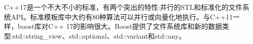 

C++17是一个不大不小的标准，有两个突出的特性:并行的STL和标准化的文件系统API。标准模板库中大约有80种算法可以并行或向量化地执行。与C++11一样，boost库对C++ 17的影响很大。Boost提供了文件系统库和新的数据类型:std::string\_view、std::optional、std::variant和std::any。